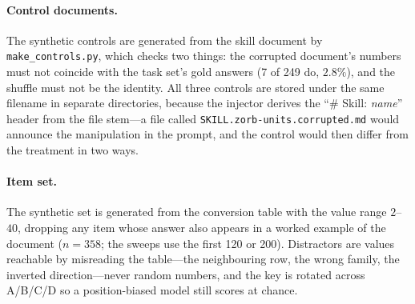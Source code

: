 \documentclass{article}
\begin{document}
\paragraph{Control documents.} The synthetic controls are generated from the
skill document by \texttt{make\_controls.py}, which checks two things: the
corrupted document's numbers must not coincide with the task set's gold answers
(7 of 249 do, $2.8\%$), and the shuffle must not be the identity. All three
controls are stored under the same filename in separate directories, because the
injector derives the ``\# Skill: \emph{name}'' header from the file stem---a file
called \texttt{SKILL.zorb-units.corrupted.md} would announce the manipulation in
the prompt, and the control would then differ from the treatment in two ways.

\paragraph{Item set.} The synthetic set is generated from the conversion table
with the value range $2$--$40$, dropping any item whose answer also appears in a
worked example of the document ($n=358$; the sweeps use the first 120 or 200).
Distractors are values reachable by misreading the table---the neighbouring row,
the wrong family, the inverted direction---never random numbers, and the key is
rotated across A/B/C/D so a position-biased model still scores at chance.
\end{document}

